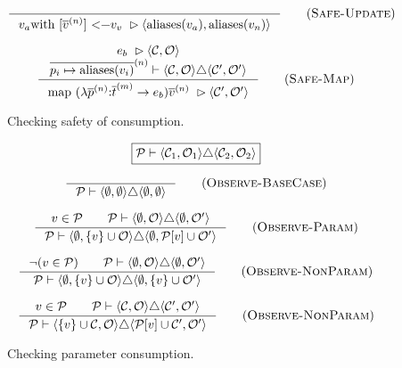\begin{figure}
\begin{equation*}
\inference{
}{
  \inPlaceSafe{
    \text{\lstinline[mathescape]!$v_{a}$ with [$\nseq{v}{n}$] <- $v_{v}$!}
  }{\aliases{v_{a}}}{\aliases{v_{n}}}
}\tagsc{Safe-Update}
\end{equation*}

\begin{equation*}
\inference{
  \inPlaceSafe{e_{b}}{\mathcal{C}}{\mathcal{O}}
  \\
  \consumedOK
  {\nseq{p_{i} \mapsto \aliases{v_{i}}}{n}}
  {\langle\mathcal{C},\mathcal{O}\rangle}
  {\langle\mathcal{C}',\mathcal{O}'\rangle}
}{
  \inPlaceSafe
  {\text{\lstinline[mathescape]!map ($\fn\nseq{p}{n}$: $\nseq{t}{m} \rightarrow e_{b}$) $\nseq{v}{n}$!}}
  {\mathcal{C}'}{\mathcal{O}'}
}
\tagsc{Safe-Map}
\end{equation*}

  \caption{Checking safety of consumption.}
  \label{fig:uniqueness-rules}
\end{figure}

\begin{figure}
\begin{equation*}
\boxed{
  \mathcal{P} \vdash \langle\mathcal{C}_{1},\mathcal{O}_{1}\rangle \triangle \langle\mathcal{C}_{2},\mathcal{O}_{2}\rangle
}
\end{equation*}

\begin{equation*}
\inference{
}{
\mathcal{P} \vdash \langle \emptyset, \emptyset \rangle \triangle \langle \emptyset, \emptyset \rangle
} \tagsc{Observe-BaseCase}
\end{equation*}

\begin{equation*}
\inference{
v \in \mathcal{P} \qquad \mathcal{P} \vdash \langle \emptyset, \mathcal{O} \rangle \triangle \langle \emptyset, \mathcal{O}' \rangle
}
{
\mathcal{P} \vdash \langle \emptyset, \{ v \} \cup \mathcal{O} \rangle \triangle \langle \emptyset, \mathcal{P}[v] \cup \mathcal{O}' \rangle
}\tagsc{Observe-Param}
\end{equation*}

\begin{equation*}
\inference{
\neg(v \in \mathcal{P}) \qquad \mathcal{P} \vdash \langle \emptyset, \mathcal{O} \rangle \triangle \langle \emptyset, \mathcal{O}' \rangle
}
{
\mathcal{P} \vdash \langle \emptyset, \{ v \} \cup \mathcal{O} \rangle \triangle \langle \emptyset, \{ v \} \cup \mathcal{O}' \rangle
}\tagsc{Observe-NonParam}
\end{equation*}

\begin{equation*}
\inference{
v \in \mathcal{P} \qquad \mathcal{P} \vdash \langle \mathcal{C}, \mathcal{O} \rangle \triangle \langle \mathcal{C}', \mathcal{O}' \rangle
}
{
\mathcal{P} \vdash \langle \{ v \} \cup \mathcal{C}, \mathcal{O} \rangle \triangle \langle \mathcal{P}[v] \cup \mathcal{C}', \mathcal{O}' \rangle
}\tagsc{Observe-NonParam}
\end{equation*}
  \caption{Checking parameter consumption.}
  \label{fig:parameter-consumption}
\end{figure}


